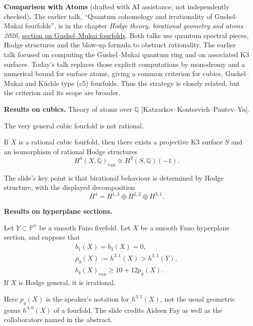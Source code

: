 \medskip\noindent
\textbf{Comparison with Atoms} (drafted
with AI assistance; not independently
checked)\textbf{.}
The earlier talk, ``Quantum cohomology and
irrationality of Gushel-Mukai fourfolds'',
is in the chapter
\emph{Hodge theory, birational geometry
and atoms 2026},
\href{https://www.heap-project.org/tag/04YR}
{section on Gushel--Mukai fourfolds}.
Both talks use quantum spectral pieces,
Hodge structures and the blow-up formula
to obstruct rationality. The earlier talk
focused on computing the Gushel--Mukai
quantum ring and on associated K3 surfaces.
Today's talk replaces those explicit
computations by monodromy and a numerical
bound for surface atoms, giving a common
criterion for cubics, Gushel--Mukai and
K\"uchle type (c5) fourfolds. Thus the
strategy is closely related, but the
criterion and its scope are broader.

\medskip\noindent
\textbf{Results on cubics.}
Theory of atoms over $\mathbb Q$
[Katzarkov--Kontsevich--Pantev--Yu].

\begin{theorem}
\label{theorem-vbac-cubic}
The very general cubic fourfold is not
rational.
\end{theorem}

\begin{theorem}[Gu\'er\'e, as presented]
\label{theorem-vbac-guere}
If $X$ is a rational cubic fourfold, then
there exists a projective K3 surface $S$
and an isomorphism of rational Hodge
structures
$$
H^4(X,\mathbb Q)_{\mathrm{van}}
\cong H^2(S,\mathbb Q)(-1).
$$
\end{theorem}
The slide's key point is that birational
behaviour is determined by Hodge structure,
with the displayed decomposition
$$
H^4=H^{1,3}\oplus H^{2,2}\oplus H^{3,1}.
$$

\medskip\noindent
\textbf{Results on hyperplane sections.}

\begin{theorem}
\label{theorem-vbac-hyperplanes}
Let $Y\subset\mathbb P^n$ be a smooth
Fano fivefold. Let $X$ be a smooth Fano
hyperplane section, and suppose that
$$
\begin{gathered}
b_1(X)=b_3(X)=0,\\
p_g(X):=h^{3,1}(X)>h^{3,1}(Y),\\
b_4(X)_{\mathrm{van}}\geq10+12p_g(X).
\end{gathered}
$$
If $X$ is Hodge general, it is irrational.
\end{theorem}
Here $p_g(X)$ is the speaker's notation
for $h^{3,1}(X)$, not the usual geometric
genus $h^{4,0}(X)$ of a fourfold.
The slide credits Aideen Fay as well as
the collaborators named in the abstract.

